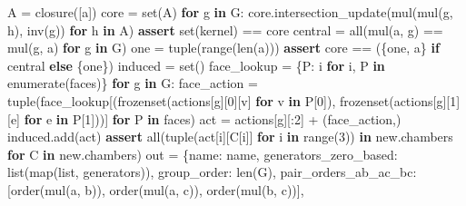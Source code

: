 \documentclass[
  10pt,
  letterpaper,
]{article}
\newenvironment{Shaded}{}{}
\newcommand{\BuiltInTok}[1]{\textcolor[rgb]{0.00,0.50,0.00}{#1}}
\newcommand{\ControlFlowTok}[1]{\textcolor[rgb]{0.00,0.44,0.13}{\textbf{#1}}}
\newcommand{\DecValTok}[1]{\textcolor[rgb]{0.25,0.63,0.44}{#1}}
\newcommand{\KeywordTok}[1]{\textcolor[rgb]{0.00,0.44,0.13}{\textbf{#1}}}
\newcommand{\NormalTok}[1]{#1}
\newcommand{\OperatorTok}[1]{\textcolor[rgb]{0.40,0.40,0.40}{#1}}
\newcommand{\StringTok}[1]{\textcolor[rgb]{0.25,0.44,0.63}{#1}}
\begin{document}
\begin{Shaded}
\begin{Highlighting}[]
\NormalTok{    A }\OperatorTok{=}\NormalTok{ closure([a])}
\NormalTok{    core }\OperatorTok{=} \BuiltInTok{set}\NormalTok{(A)}
    \ControlFlowTok{for}\NormalTok{ g }\KeywordTok{in}\NormalTok{ G:}
\NormalTok{        core.intersection\_update(mul(mul(g, h), inv(g)) }\ControlFlowTok{for}\NormalTok{ h }\KeywordTok{in}\NormalTok{ A)}
    \ControlFlowTok{assert} \BuiltInTok{set}\NormalTok{(kernel) }\OperatorTok{==}\NormalTok{ core}
\NormalTok{    central }\OperatorTok{=} \BuiltInTok{all}\NormalTok{(mul(a, g) }\OperatorTok{==}\NormalTok{ mul(g, a) }\ControlFlowTok{for}\NormalTok{ g }\KeywordTok{in}\NormalTok{ G)}
\NormalTok{    one }\OperatorTok{=} \BuiltInTok{tuple}\NormalTok{(}\BuiltInTok{range}\NormalTok{(}\BuiltInTok{len}\NormalTok{(a)))}
    \ControlFlowTok{assert}\NormalTok{ core }\OperatorTok{==}\NormalTok{ (\{one, a\} }\ControlFlowTok{if}\NormalTok{ central }\ControlFlowTok{else}\NormalTok{ \{one\})}
\NormalTok{    induced }\OperatorTok{=} \BuiltInTok{set}\NormalTok{()}
\NormalTok{    face\_lookup }\OperatorTok{=}\NormalTok{ \{P: i }\ControlFlowTok{for}\NormalTok{ i, P }\KeywordTok{in} \BuiltInTok{enumerate}\NormalTok{(faces)\}}
    \ControlFlowTok{for}\NormalTok{ g }\KeywordTok{in}\NormalTok{ G:}
\NormalTok{        face\_action }\OperatorTok{=} \BuiltInTok{tuple}\NormalTok{(face\_lookup[(}\BuiltInTok{frozenset}\NormalTok{(actions[g][}\DecValTok{0}\NormalTok{][v] }\ControlFlowTok{for}\NormalTok{ v }\KeywordTok{in}\NormalTok{ P[}\DecValTok{0}\NormalTok{]),}
                                        \BuiltInTok{frozenset}\NormalTok{(actions[g][}\DecValTok{1}\NormalTok{][e] }\ControlFlowTok{for}\NormalTok{ e }\KeywordTok{in}\NormalTok{ P[}\DecValTok{1}\NormalTok{]))] }\ControlFlowTok{for}\NormalTok{ P }\KeywordTok{in}\NormalTok{ faces)}
\NormalTok{        act }\OperatorTok{=}\NormalTok{ actions[g][:}\DecValTok{2}\NormalTok{] }\OperatorTok{+}\NormalTok{ (face\_action,)}
\NormalTok{        induced.add(act)}
        \ControlFlowTok{assert} \BuiltInTok{all}\NormalTok{(}\BuiltInTok{tuple}\NormalTok{(act[i][C[i]] }\ControlFlowTok{for}\NormalTok{ i }\KeywordTok{in} \BuiltInTok{range}\NormalTok{(}\DecValTok{3}\NormalTok{)) }\KeywordTok{in}\NormalTok{ new.chambers }\ControlFlowTok{for}\NormalTok{ C }\KeywordTok{in}\NormalTok{ new.chambers)}
\NormalTok{    out }\OperatorTok{=}\NormalTok{ \{}\StringTok{\textquotesingle{}name\textquotesingle{}}\NormalTok{: name, }\StringTok{\textquotesingle{}generators\_zero\_based\textquotesingle{}}\NormalTok{: }\BuiltInTok{list}\NormalTok{(}\BuiltInTok{map}\NormalTok{(}\BuiltInTok{list}\NormalTok{, generators)),}
           \StringTok{\textquotesingle{}group\_order\textquotesingle{}}\NormalTok{: }\BuiltInTok{len}\NormalTok{(G), }\StringTok{\textquotesingle{}pair\_orders\_ab\_ac\_bc\textquotesingle{}}\NormalTok{: [order(mul(a, b)), order(mul(a, c)), order(mul(b, c))],}

\end{Highlighting}
\end{Shaded}
\end{document}
